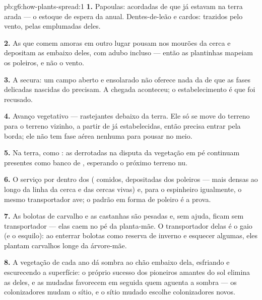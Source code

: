 \begin{solution}{pb:g6:how-plants-spread:1}
\textbf{1.} Papoulas: acordadas de  que já estavam na terra
arada --- o estoque de espera da anual. Dentes-de-leão e cardos:
trazidos pelo vento, pelas  emplumadas deles.

\textbf{2.} As  que comem amoras em outro lugar pousam nos
mourões da cerca e depositam as  embaixo deles, com adubo
incluso --- então as plantinhas mapeiam os poleiros, e não o vento.

\textbf{3.} A secura: um campo aberto e ensolarado não oferece nada
da  de que as fases delicadas nascidas do  precisam. A
chegada aconteceu; o estabelecimento é que foi recusado.

\textbf{4.} Avanço vegetativo ---  rastejantes debaixo da terra.
Ele só se move do terreno para o terreno vizinho, a partir de 
já estabelecidas, então precisa entrar pela borda; ele não tem fase
aérea nenhuma para pousar no meio.

\textbf{5.} Na terra, como : as  derrotadas na disputa
da vegetação em pé continuam presentes como banco de ,
esperando o próximo terreno nu.

\textbf{6.} O serviço por dentro dos  ( comidos, 
depositadas dos poleiros --- mais densas ao longo da linha da cerca e
das cercas vivas) e, para o espinheiro igualmente, o mesmo
transportador ave; o padrão em forma de poleiro é a prova.

\textbf{7.} As bolotas de carvalho e as castanhas são pesadas e, sem
ajuda, ficam sem transportador --- elas caem no pé da planta-mãe. O
transportador delas é o gaio (e o esquilo): ao enterrar bolotas como
reserva de inverno e esquecer algumas, eles plantam carvalhos longe da
árvore-mãe.

\textbf{8.} A vegetação de cada ano dá sombra ao chão embaixo dela,
esfriando e escurecendo a superfície: o próprio sucesso dos pioneiros
amantes do sol elimina as  deles, e as  mudadas
favorecem em seguida quem aguenta a sombra --- os colonizadores mudam
o sítio, e o sítio mudado escolhe colonizadores novos.


\end{solution}
